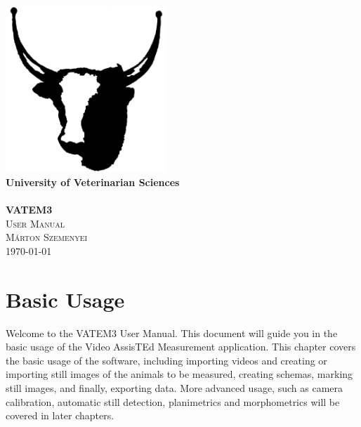\documentclass[10pt,a4paper,oneside]{report}             %
\author{\vikauthor}
\title{\viktitle}
\newcommand{\vikauthor}{Márton Szemenyei}
\newcommand{\viktitle}{VATEM3}
\newcommand{\vikdept}{}
\newcommand{\vikdoktipus}{User Manual}
\begin{document}
\singlespacing

\begin{titlepage}
\begin{center}
\includegraphics[width=60mm,keepaspectratio]{../VAM/icons/ikon01.png}\\
\vspace{0.3cm}
\textbf{University of Veterinarian Sciences}\\
\textmd{\vikdept}\\[5cm]

\vspace{0.4cm}
{\huge \bfseries \viktitle}\\[0.8cm]
\textsc{\Large \vikdoktipus}\\[2cm]
\textsc{\Large \vikauthor}\\[6cm]

\vfill
{\large \today}
\end{center}
\end{titlepage}


\singlespacing
\tableofcontents\thispagestyle{fancy}


\chapter{Basic Usage}

Welcome to the VATEM3 User Manual. This document will guide you in the basic usage of the Video AssisTEd Measurement application. This chapter covers the basic usage of the software, including importing videos and creating or importing still images of the animals to be measured, creating schemas, marking still images, and finally, exporting data. More advanced usage, such as camera calibration, automatic still detection, planimetrics and morphometrics will be covered in later chapters. 
 
\end{document}
